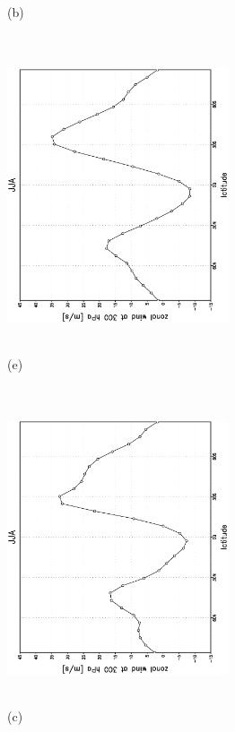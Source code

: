 \documentclass[12pt,a4paper,twoside,openright,headinclude,liststotoc,bibtotoc]{scrreprt}
\begin{document}
\begin{appendix}
\begin{figure}[b]
{}
\parbox{8.5cm}{\hspace{0.80cm} \begin{scriptsize}(b) \end{scriptsize} \vspace{-0.5cm} \\
\includegraphics[height=8.5cm,width=6.5cm,angle=-90]
{eps/zonysmu_300JJA.eps}
}
\parbox{8.5cm}{\hspace{0.80cm} \begin{scriptsize}(e) \end{scriptsize} \vspace{-0.5cm} \\
\includegraphics[height=8.5cm,width=6.5cm,angle=-90]
{eps/t21zonysmuvel131JJA300.eps}
}
\parbox{8.5cm}{\hspace{0.80cm} \begin{scriptsize}(c) \end{scriptsize} \vspace{-0.5cm} \\
}
\end{figure}
\end{appendix}
\end{document}
